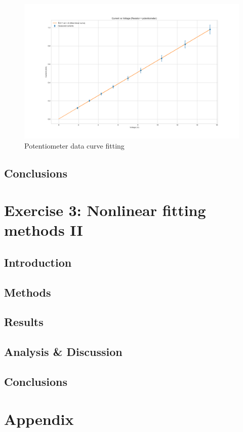 \documentclass[letterpaper,12pt]{article}
\begin{document}
\begin{figure}[H]
  \centering
  \includegraphics[width=0.8\linewidth]{../lab_1_ex_1_plot_potentiometer.png}    
  \caption{Potentiometer data curve fitting}
  \label{potentiometer-curve-fit}
\end{figure}

\subsection{Conclusions}

\pagebreak

\section{Exercise 3:  Nonlinear fitting methods II}

\subsection{Introduction}
\subsection{Methods}
\subsection{Results}
\subsection{Analysis \& Discussion }
\subsection{Conclusions}

\pagebreak

\section*{\hfil Appendix\hfil}
\end{document}
